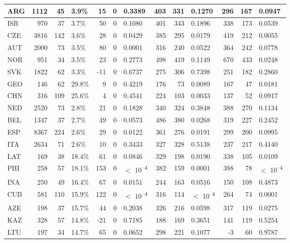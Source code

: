 \begin{tabular}{l|r|r|l|r|r|l|r|r|l|r|r|l}
\hline
ARG & 1112 & 45 & 3.9\% & 15 & 0 & 0.3389 & 403 & 331 & 0.1270 & 296 & 167 & 0.0947\\
\hline
ISR & 970 & 37 & 3.7\% & 50 & 0 & 0.1080 & 401 & 343 & 0.1896 & 338 & 173 & 0.0539\\
\hline
CZE & 3816 & 142 & 3.6\% & 28 & 0 & 0.0429 & 385 & 295 & 0.0179 & 419 & 212 & 0.0055\\
\hline
AUT & 2000 & 73 & 3.5\% & 80 & 0 & 0.0001 & 316 & 240 & 0.0522 & 364 & 242 & 0.0778\\
\hline
NOR & 951 & 34 & 3.5\% & 23 & 0 & 0.2773 & 498 & 419 & 0.1149 & 670 & 433 & 0.0248\\
\hline
SVK & 1822 & 62 & 3.3\% & -11 & 0 & 0.6737 & 275 & 306 & 0.7398 & 251 & 182 & 0.2860\\
\hline
GEO & 146 & 62 & 29.8\% & 9 & 0 & 0.4219 & 176 & 73 & 0.0089 & 167 & 47 & 0.0181\\
\hline
CHN & 316 & 109 & 25.6\% & 4 & 0 & 0.4541 & 224 & 103 & 0.0033 & 137 & 52 & 0.0917\\
\hline
NED & 2520 & 73 & 2.8\% & 21 & 0 & 0.1828 & 340 & 324 & 0.3848 & 388 & 270 & 0.1134\\
\hline
BEL & 1347 & 37 & 2.7\% & 49 & 0 & 0.0573 & 486 & 380 & 0.0268 & 319 & 227 & 0.2452\\
\hline
ESP & 8367 & 224 & 2.6\% & 29 & 0 & 0.0122 & 361 & 276 & 0.0191 & 299 & 200 & 0.0995\\
\hline
ITA & 2634 & 71 & 2.6\% & 10 & 0 & 0.3433 & 327 & 328 & 0.5138 & 237 & 217 & 0.4140\\
\hline
LAT & 169 & 38 & 18.4\% & 61 & 0 & 0.0846 & 329 & 198 & 0.0190 & 338 & 105 & 0.0109\\
\hline
PHI & 258 & 57 & 18.1\% & 153 & 0 & $<$ 10\textsuperscript{--4} & 382 & 159 & 0.0001 & 388 & 78 & $<$ 10\textsuperscript{--4}\\
\hline
INA & 250 & 49 & 16.4\% & 67 & 0 & 0.0151 & 244 & 163 & 0.0516 & 150 & 108 & 0.4873\\
\hline
CUB & 581 & 110 & 15.9\% & 122 & 0 & $<$ 10\textsuperscript{--4} & 316 & 114 & $<$ 10\textsuperscript{--4} & 264 & 74 & 0.0001\\
\hline
AZE & 198 & 37 & 15.7\% & 44 & 0 & 0.2038 & 326 & 216 & 0.0598 & 317 & 119 & 0.0275\\
\hline
KAZ & 328 & 57 & 14.8\% & -21 & 0 & 0.7185 & 188 & 169 & 0.3651 & 141 & 119 & 0.5254\\
\hline
LTU & 197 & 34 & 14.7\% & 65 & 0 & 0.0652 & 298 & 221 & 0.1077 & -3 & 60 & 0.9787\\

\end{tabular}
